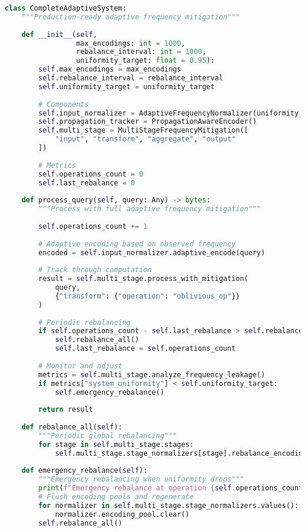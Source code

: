 \begin{lstlisting}[language=Python, caption={Complete adaptive frequency mitigation system}]
class CompleteAdaptiveSystem:
    """Production-ready adaptive frequency mitigation"""
    
    def __init__(self, 
                 max_encodings: int = 1000,
                 rebalance_interval: int = 1000,
                 uniformity_target: float = 0.95):
        self.max_encodings = max_encodings
        self.rebalance_interval = rebalance_interval
        self.uniformity_target = uniformity_target
        
        # Components
        self.input_normalizer = AdaptiveFrequencyNormalizer(uniformity_target)
        self.propagation_tracker = PropagationAwareEncoder()
        self.multi_stage = MultiStageFrequencyMitigation([
            "input", "transform", "aggregate", "output"
        ])
        
        # Metrics
        self.operations_count = 0
        self.last_rebalance = 0
        
    def process_query(self, query: Any) -> bytes:
        """Process with full adaptive frequency mitigation"""
        
        self.operations_count += 1
        
        # Adaptive encoding based on observed frequency
        encoded = self.input_normalizer.adaptive_encode(query)
        
        # Track through computation
        result = self.multi_stage.process_with_mitigation(
            query,
            {"transform": {"operation": "oblivious_op"}}
        )
        
        # Periodic rebalancing
        if self.operations_count - self.last_rebalance > self.rebalance_interval:
            self.rebalance_all()
            self.last_rebalance = self.operations_count
        
        # Monitor and adjust
        metrics = self.multi_stage.analyze_frequency_leakage()
        if metrics["system_uniformity"] < self.uniformity_target:
            self.emergency_rebalance()
        
        return result
    
    def rebalance_all(self):
        """Periodic global rebalancing"""
        for stage in self.multi_stage.stages:
            self.multi_stage.stage_normalizers[stage].rebalance_encodings()
    
    def emergency_rebalance(self):
        """Emergency rebalancing when uniformity drops"""
        print(f"Emergency rebalance at operation {self.operations_count}")
        # Flush encoding pools and regenerate
        for normalizer in self.multi_stage.stage_normalizers.values():
            normalizer.encoding_pool.clear()
        self.rebalance_all()
\end{lstlisting}

